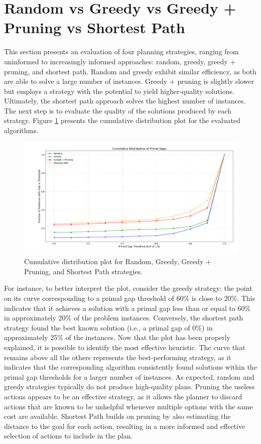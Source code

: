 \section{Random vs Greedy vs Greedy + Pruning vs Shortest Path}
This section presents an evaluation of four planning strategies, ranging from uninformed to increasingly informed approaches:
random, greedy, greedy + pruning, and shortest path.
Random and greedy exhibit similar efficiency, as both are able to solve a large number of instances. Greedy + pruning is
slightly slower but employs a strategy with the potential to yield higher-quality solutions. Ultimately, the shortest path approach
solves the highest number of instances. The next step is to evaluate the quality of the solutions produced by each strategy.
Figure \ref{fig:rgps} presents the cumulative distribution plot for the evaluated algorithms.

\begin{figure}[ht]
	\centering
	\includegraphics[width=\textwidth]{images/algs0124.png}
	\caption{Cumulative distribution plot for Random, Greedy, Greedy + Pruning, and Shortest Path strategies.}
	\label{fig:rgps}
\end{figure}

For instance, to better interpret the plot, consider the greedy strategy: the point on its curve corresponding to
a primal gap threshold of 60\% is close to 20\%. This indicates that it achieves a solution with a primal gap less than
or equal to 60\% in approximately 20\% of the problem instances.
Conversely, the shortest path strategy found the best known solution (i.e., a primal gap of 0\%) in approximately
25\% of the instances.
Now that the plot has been properly explained, it is possible to identify the most effective heuristic.
The curve that remains above all the others represents the best-performing strategy, as it indicates that the corresponding
algorithm consistently found solutions within the primal gap thresholds for a larger number of instances.
As expected, random and greedy strategies typically do not produce high-quality plans. Pruning the useless actions appears to be
an effective strategy, as it allows the planner to discard actions that are known to be unhelpful whenever multiple
options with the same cost are available.
Shortest Path builds on pruning by also estimating the distance to the goal for each action, resulting in a more
informed and effective selection of actions to include in the plan.

